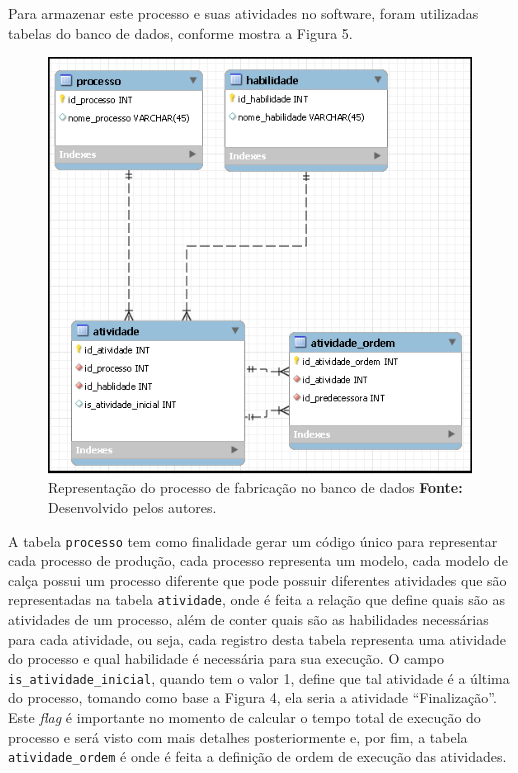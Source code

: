\par Para armazenar este processo e suas atividades no software, foram
utilizadas tabelas do banco de dados, conforme mostra a Figura 5.

\begin{figure}[h!]
	\centerline{\includegraphics[scale=0.7]{./imagens/representacao_processo.png}}
	\caption[Representação do processo de fabricação no banco de dados]
	{Representação do processo de fabricação no banco de dados \textbf{Fonte:}
	Desenvolvido pelos autores.}
	\label{fig:exemplo1}
\end{figure}

\par A tabela \texttt{processo} tem como finalidade gerar um código único para representar 
cada processo de produção, cada processo representa um modelo, cada modelo
de calça possui um processo diferente que pode possuir diferentes atividades que
são representadas na tabela \texttt{atividade}, onde é feita a relação que define quais são as atividades de 
um processo,  além de conter quais são as habilidades necessárias para cada atividade, ou seja, cada registro desta 
tabela representa uma atividade do processo e qual habilidade é necessária para sua execução. O campo 
\texttt{is\_atividade\_inicial}, quando tem o valor 1, define que tal atividade
é a última do processo, tomando como base a Figura 4, ela seria a atividade
``Finalização''. Este \textit{flag} é importante no momento de calcular o tempo total de execução do
processo e será visto com mais detalhes posteriormente e, por fim, a tabela
\texttt{atividade\_ordem} é onde é feita a definição de ordem de execução das
atividades.

